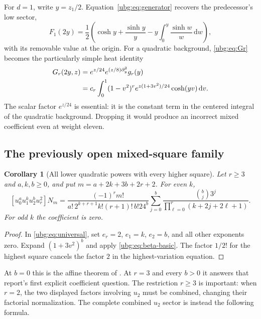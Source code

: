\documentclass[11pt,letterpaper]{article}
\numberwithin{equation}{section}
\newtheorem{corollary}[theorem]{Corollary}
\theoremstyle{definition}\newtheorem{definition}[theorem]{Definition}
\theoremstyle{remark}\newtheorem{remark}[theorem]{Remark}
\newcommand{\dd}{\,\mathrm d}\newcommand{\ii}{\mathrm i}
\begin{document}
For $d=1$, write $y=z_1/2$. Equation~\eqref{ubg:eq:generator} recovers
the predecessor's low sector,
\begin{equation}\label{ubg:eq:F1}
 F_1(2y)=\frac12\left(\cosh y+\frac{\sinh y}{y}
                      -y\int_0^y\frac{\sinh w}{w}\dd w\right),
\end{equation}
with its removable value at the origin. For a quadratic background,
\eqref{ubg:eq:Gr} becomes the particularly simple heat identity
\begin{align}
 G_r(2y,z)
 &=e^{z/24}e^{(z/8)\partial_y^2}g_r(y)\notag\\
 &=c_r\int_0^1(1-v^2)^r e^{z(1+3v^2)/24}\cosh(yv)\dd v.
 \label{ubg:eq:heat}
\end{align}
The scalar factor $e^{z/24}$ is essential: it is the constant term in
the centered integral of the quadratic background. Dropping it would
produce an incorrect mixed coefficient even at weight eleven.

\subsection{The previously open mixed-square family}
\begin{corollary}[All lower quadratic powers with every higher square]
\label{ubg:cor:mixed}
Let $r\ge3$ and $a,k,b\ge0$, and put $m=a+2k+3b+2r+2$.
For even $k$,
\begin{equation}\label{ubg:eq:mixed}
 \boxed{\displaystyle
 [u_0^a u_1^k u_2^b u_r^2]N_m
 =\frac{(-1)^r m!}
 {a!\,2^{k+r+1}k!(r+1)!\,b!24^b}
 \sum_{j=0}^b\frac{\binom bj3^j}
                 {\prod_{\ell=0}^r(k+2j+2\ell+1)}.}
\end{equation}
For odd $k$ the coefficient is zero.
\end{corollary}
\begin{proof}
In \eqref{ubg:eq:universal}, set $e_r=2$, $e_1=k$, $e_2=b$, and
all other exponents zero. Expand $(1+3v^2)^b$ and apply
\eqref{ubg:eq:beta-basic}. The factor $1/2!$ for the highest square
cancels the factor $2$ in the highest-variation equation.
\end{proof}

At $b=0$ this is the affine theorem of \cite{Affine}.
At $r=3$ and every $b>0$ it answers that report's first explicit
coefficient question. The restriction $r\ge3$ is important: when
$r=2$, the two displayed factors involving $u_2$ must be combined,
changing their factorial normalization.
The complete combined $u_2$ sector is instead the following formula.
\end{document}
